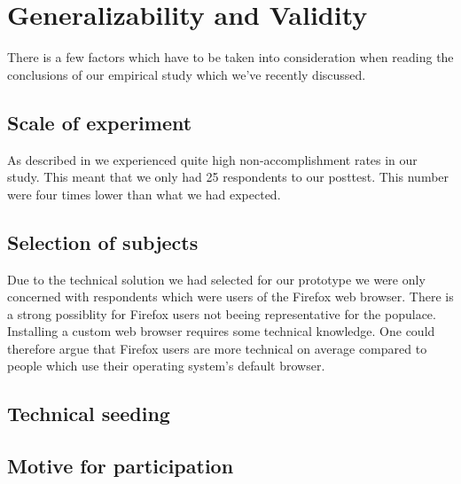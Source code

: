 \section{Generalizability and Validity}

There is a few factors which have to be taken into consideration when reading
the conclusions of our empirical study which we've recently discussed.

\subsection{Scale of experiment}

As described in 
we experienced quite high non-accomplishment rates in our study. This meant
that we only had 25 respondents to our posttest. This number were four times
lower than what we had expected.%

\subsection{Selection of subjects}

Due to the technical solution we had selected for our prototype we were only
concerned with respondents which were users of the Firefox web browser.
There is a strong possiblity for Firefox users not beeing representative for
the \urort{} populace. Installing a custom web browser%
requires some technical knowledge. One could therefore argue that Firefox
users are more technical on average compared to people which use their
operating system's default browser.

\subsection{Technical seeding}


\subsection{Motive for participation}


